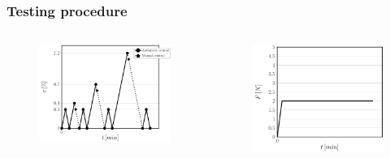 \documentclass[first,firstsupp,lastsupp,last,hyperref,table]{ETHclass}
\begin{document}
\begin{frame}
\frametitle{\vspace{0.3cm}\small Testing procedure}
\vspace{-1.1cm}
\centering
\begin{columns}[c]
\begin{column}{0.5\textwidth}
\begin{figure}
\centering
\includegraphics[width=\columnwidth]{testing-procedure}
\end{figure}
\end{column}
\begin{column}{0.5\textwidth}
\centering
\begin{figure}
\centering
\includegraphics[width=\columnwidth]{testing-procedure-temp}

\end{figure}
\end{column}
\end{columns}
\end{frame}
\end{document}
